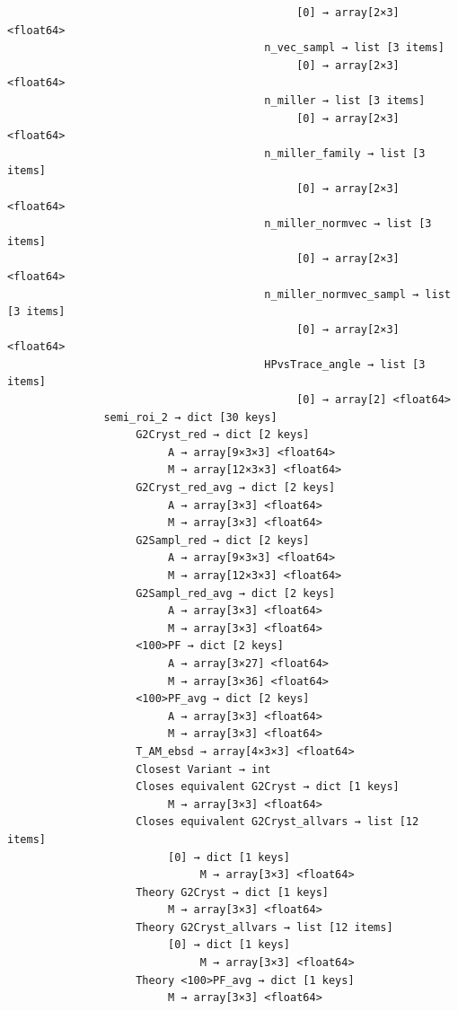 \documentclass[a4paper,10pt]{article}
\begin{document}
\begin{verbatim}
                                             [0] → array[2×3] <float64>
                                        n_vec_sampl → list [3 items]
                                             [0] → array[2×3] <float64>
                                        n_miller → list [3 items]
                                             [0] → array[2×3] <float64>
                                        n_miller_family → list [3 items]
                                             [0] → array[2×3] <float64>
                                        n_miller_normvec → list [3 items]
                                             [0] → array[2×3] <float64>
                                        n_miller_normvec_sampl → list [3 items]
                                             [0] → array[2×3] <float64>
                                        HPvsTrace_angle → list [3 items]
                                             [0] → array[2] <float64>
               semi_roi_2 → dict [30 keys]
                    G2Cryst_red → dict [2 keys]
                         A → array[9×3×3] <float64>
                         M → array[12×3×3] <float64>
                    G2Cryst_red_avg → dict [2 keys]
                         A → array[3×3] <float64>
                         M → array[3×3] <float64>
                    G2Sampl_red → dict [2 keys]
                         A → array[9×3×3] <float64>
                         M → array[12×3×3] <float64>
                    G2Sampl_red_avg → dict [2 keys]
                         A → array[3×3] <float64>
                         M → array[3×3] <float64>
                    <100>PF → dict [2 keys]
                         A → array[3×27] <float64>
                         M → array[3×36] <float64>
                    <100>PF_avg → dict [2 keys]
                         A → array[3×3] <float64>
                         M → array[3×3] <float64>
                    T_AM_ebsd → array[4×3×3] <float64>
                    Closest Variant → int
                    Closes equivalent G2Cryst → dict [1 keys]
                         M → array[3×3] <float64>
                    Closes equivalent G2Cryst_allvars → list [12 items]
                         [0] → dict [1 keys]
                              M → array[3×3] <float64>
                    Theory G2Cryst → dict [1 keys]
                         M → array[3×3] <float64>
                    Theory G2Cryst_allvars → list [12 items]
                         [0] → dict [1 keys]
                              M → array[3×3] <float64>
                    Theory <100>PF_avg → dict [1 keys]
                         M → array[3×3] <float64>

\end{verbatim}
\end{document}
